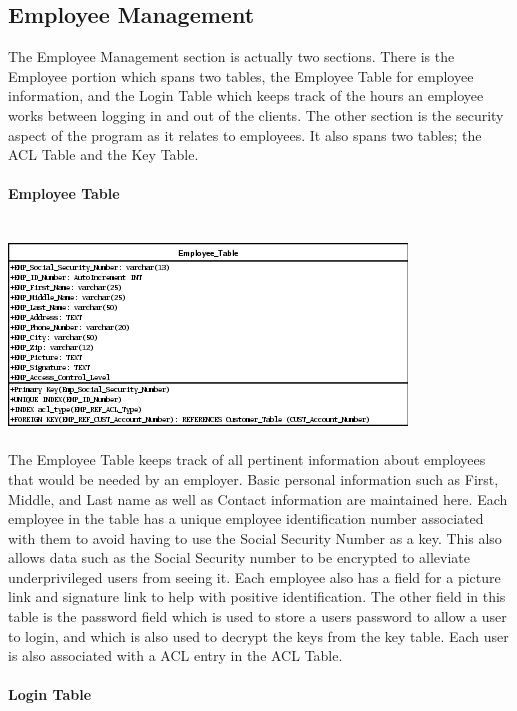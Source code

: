 \documentclass{report}
\begin{document}
    \subsection{Employee Management}

    The Employee Management section is actually two sections. There is the Employee portion which
    spans two tables, the Employee Table for employee information, and the Login Table which
    keeps track of the hours an employee works between logging in and out of the clients. The
    other section is the security aspect of the program as it relates to employees. It also spans
    two tables; the ACL Table and the Key Table.\\
    \\
    {\bf Employee Table}\\
    \\
    \\
    \includegraphics{Tables/EmployeeTable.png}
    \\
    \\
    The Employee Table keeps track of all pertinent information about employees that would
    be needed by an employer. Basic personal information such as First, Middle, and Last name
    as well as Contact information are maintained here. Each employee in the table has a unique
    employee identification number associated with them to avoid having to use the Social
    Security Number as a key. This also allows data such as the Social Security number to be
    encrypted to alleviate underprivileged users from seeing it. Each employee also has a
    field for a picture link and signature link to help with positive identification. The other
    field in this table is the password field which is used to store a users password to allow
    a user to login, and which is also used to decrypt the keys from the key table. Each user
    is also associated with a ACL entry in the ACL Table.\\
    \\
    {\bf Login Table}\\
\end{document}
